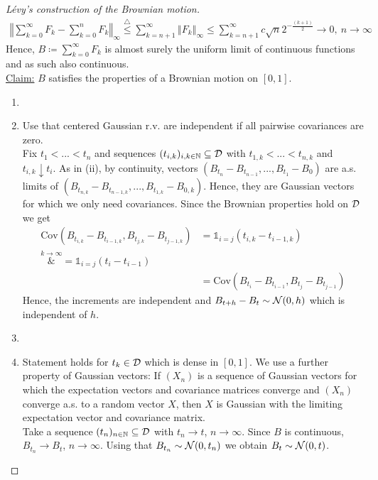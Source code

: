 \begin{proof}[L\'evy's construction of the Brownian motion]
			\begin{align*}
				\left\Vert \sum_{k=0}^{\infty} F_k - \sum_{k=0}^n F_k \right\Vert_{\infty} \overset{\triangle}{\leq} \sum_{k=n+1}^{\infty} \left\Vert F_k \right\Vert_{\infty} \leq \sum_{k=n+1}^{\infty} c \sqrt{n} 2^{-\frac{(k+1)}{2}} \rightarrow 0, \: n \to \infty
			\end{align*}
		Hence, $B \coloneqq \sum_{k=0}^{\infty} F_k$ is almost surely the uniform limit of continuous functions and as such also continuous.\\
		\underline{Claim:} $B$ satisfies the properties of a Brownian motion on $[0,1]$.
		\begin{enumerate}[label=(\roman*)]
			\item \checkmark
			\item
				Use that centered Gaussian r.v. are independent if all pairwise covariances are zero.\\
				Fix $t_1 < ... < t_n$ and sequences $(t_{i,k})_{i,k \in \mathbb{N}} \subseteq \mathcal{D}$ with $t_{1,k} < ... < t_{n,k}$ and $t_{i,k}\downarrow t_i$. As in (ii), by continuity, vectors $(B_{t_n}-B_{t_{n-1}},...,B_{t_1}-B_0)$ are a.s. limits of $(B_{t_{n,k}}-B_{t_{n-1,k}},...,B_{t_{1,k}}-B_{0,k})$. Hence, they are Gaussian vectors for which we only need covariances. Since the Brownian properties hold on $\mathcal{D}$ we get 
				\begin{align*}
					\text{Cov}(B_{t_{i,k}}-B_{t_{i-1,k}},B_{t_{j,k}}-B_{t_{j-1,k}}) &= \mathds 1_{i=j}(t_{i,k}-t_{i-1,k})\\
						\overset{k\to\infty}&{=} \mathds 1_{i=j}(t_i-t_{i-1}) \\
						&= \text{Cov}(B_{t_i}-B_{t_{i-1}},B_{t_j}-B_{t_{j-1}})
				\end{align*}
				Hence, the increments are independent and $B_{t+h}-B_t \sim \mathcal{N}(0,h)$ which is independent of $h$.
			\item \checkmark
			\item Statement holds for $t_k\in \mathcal{D}$ which is dense in $[0,1]$. We use a further property of Gaussian vectors: If $(X_n)$ is a sequence of Gaussian vectors for which the expectation vectors and covariance matrices converge and $(X_n)$ converge a.s. to a random vector $X$, then $X$ is Gaussian with the limiting expectation vector and covariance matrix.\\
			Take a sequence $(t_n)_{n\in\mathbb{N}}\subseteq \mathcal{D}$ with $t_n \longrightarrow t$, $n\to\infty$. Since $B$ is continuous, $B_{t_n} \longrightarrow B_t$, $n\to\infty$. Using that $B_{t_n} \sim \mathcal{N}(0,t_n)$ we obtain $B_t \sim \mathcal{N}(0,t)$.
		\end{enumerate}
\end{proof}
